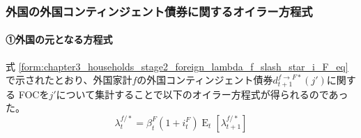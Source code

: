 \subsubsection{外国の外国コンティンジェント債券に関するオイラー方程式}
\label{sec:chapter3_representative_household_euler_contingent_foreign}

\paragraph{①外国の元となる方程式}
\label{sec:chapter3_representative_household_euler_contingent_foreign_original}
式
\eqref{form:chapter3_households_stage2_foreign_lambda_f_slash_star_i_F_eq}
で示されたとおり、外国家計\(f\)の外国コンティンジェント債券\(d_{t+1}^{f\to F*}(j')\)に関する
FOCを\(j'\)について集計することで以下のオイラー方程式が得られるのであった。
\begin{equation}
\label{form:chapter3_representative_household_euler_contingent_foreign_original_lambda_f_slash_star_i_F_eq}
    \lambda_t^{f/*}=\beta_t^F(1+i_t^F)\operatorname{E}_t[\lambda_{t+1}^{f/*}]
\end{equation}

